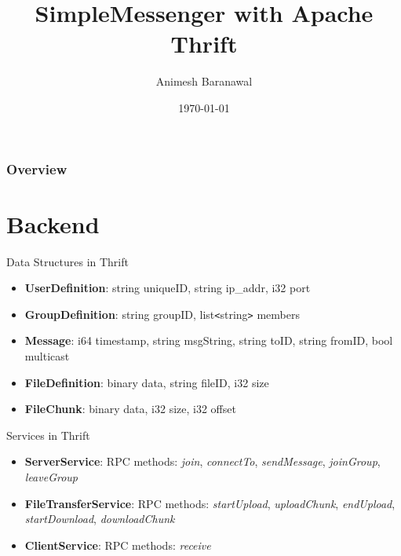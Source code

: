 \documentclass{beamer}
\title[Short title]{SimpleMessenger with Apache Thrift} %
\author{Animesh Baranawal} %
\date{\today} %
\begin{document}
\begin{frame}
\titlepage %
\end{frame}

\begin{frame}
\frametitle{Overview} %
\tableofcontents %
\end{frame}



\section{Backend}
\begin{frame}{Data Structures in Thrift}
    \begin{itemize}
        \item \textbf{UserDefinition}: string uniqueID, string ip\_addr, i32 port
        \item \textbf{GroupDefinition}: string groupID, list\texttt{<}string\texttt{>} members
        \item \textbf{Message}: i64 timestamp, string msgString, string toID, string fromID, bool multicast
        \item \textbf{FileDefinition}: binary data, string fileID, i32 size
        \item \textbf{FileChunk}: binary data, i32 size, i32 offset
    \end{itemize}
\end{frame}
\begin{frame}{Services in Thrift}
\begin{itemize}
    \item \textbf{ServerService}: RPC methods: \textit{join}, \textit{connectTo}, \textit{sendMessage}, \textit{joinGroup}, \textit{leaveGroup}
    \item \textbf{FileTransferService}: RPC methods: \textit{startUpload}, \textit{uploadChunk}, \textit{endUpload}, \textit{startDownload}, \textit{downloadChunk}
    \item \textbf{ClientService}: RPC methods: \textit{receive}
\end{itemize}
\end{frame}
\end{document}
